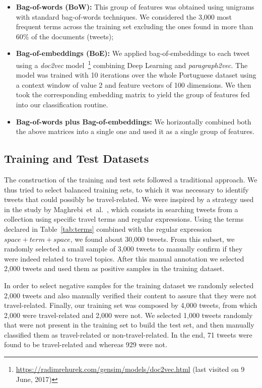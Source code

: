 \begin{itemize}
\item \textbf{Bag-of-words (BoW):} This group of features was obtained using unigrams with standard bag-of-words techniques. We considered the 3,000 most frequent terms across the training set excluding the ones found in more than 60$\%$ of the documents (tweets);

\item \textbf{Bag-of-embeddings (BoE):} We applied bag-of-embeddings to each tweet using a \textit{doc2vec} model~\footnote{\url{https://radimrehurek.com/gensim/models/doc2vec.html} (last visited on 9 June, 2017)} combining Deep Learning and \textit{paragraph2vec}. The model was trained with 10 iterations over the whole Portuguese dataset using a context window of value 2 and feature vectors of 100 dimensions. We then took the corresponding embedding matrix to yield the group of features fed into our classification routine. 

\item \textbf{Bag-of-words plus Bag-of-embeddings:} We horizontally combined both the above matrices into a single one and used it as a single group of features.
\end{itemize}

\subsection{Training and Test Datasets}
The construction of the training and test sets followed a traditional approach. We thus tried to select balanced training sets, to which it was necessary to identify tweets that could possibly be travel-related.
We were inspired by a strategy used in the study by Maghrebi~et~al.~\cite{maghrebi2016transportation}, which consists in searching tweets from a collection using specific travel terms and regular expressions. Using the terms declared in Table~\ref{tab:terms} combined with the regular expression $space + term + space$, we found about 30,000 tweets. From this subset, we randomly selected a small sample of 3,000 tweets to manually confirm if they were indeed related to travel topics. After this manual annotation we selected 2,000 tweets and used them as positive samples in the training dataset.

In order to select negative samples for the training dataset we randomly selected 2,000 tweets and also manually verified their content to assure that they were not travel-related. Finally, our training set was composed by 4,000 tweets, from which 2,000 were travel-related and 2,000 were not. 
We selected 1,000 tweets randomly that were not present in the training set to build the test set, and then manually classified them as travel-related or non-travel-related. In the end, 71 tweets were found to be travel-related and whereas 929 were not.

